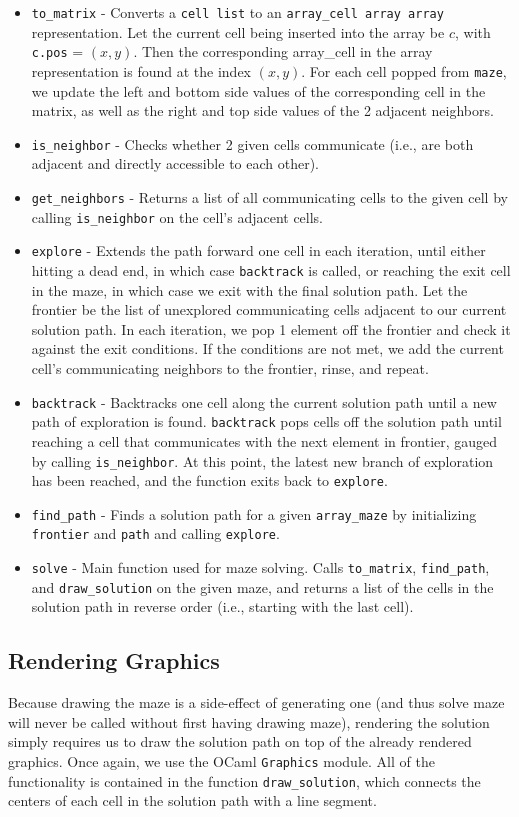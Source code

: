 \documentclass[11pt, margin=1in]{article}
\begin{document}
\begin{itemize}
\item \texttt{to\_matrix} - Converts a \texttt{cell list} to an \texttt{array\_cell array array} representation. Let the current cell being inserted into the array be $c$, with \texttt{c.pos} = $(x, y)$. Then the corresponding array\_cell in the array representation is found at the index $(x, y)$. For each cell popped from \texttt{maze}, we update the left and bottom side values of the corresponding cell in the matrix, as well as the right and top side values of the 2 adjacent neighbors.
\item \texttt{is\_neighbor} - Checks whether 2 given cells communicate (i.e., are both adjacent and directly accessible to each other).
\item \texttt{get\_neighbors} - Returns a list of all communicating cells to the given cell by calling \texttt{is\_neighbor} on the cell's adjacent cells.
\item \texttt{explore} - Extends the path forward one cell in each iteration, until either hitting a dead end, in which case \texttt{backtrack} is called, or reaching the exit cell in the maze, in which case we exit with the final solution path. Let the frontier be the list of unexplored communicating cells adjacent to our current solution path. In each iteration, we pop 1 element off the frontier and check it against the exit conditions. If the conditions are not met, we add the current cell's communicating neighbors to the frontier, rinse, and repeat.
\item \texttt{backtrack} - Backtracks one cell along the current solution path until a new path of exploration is found.   \texttt{backtrack} pops cells off the solution path until reaching a cell that communicates with the next element in frontier, gauged by calling \texttt{is\_neighbor}. At this point, the latest new branch of exploration has been reached, and the function exits back to \texttt{explore}. 
\item \texttt{find\_path} - Finds a solution path for a given \texttt{array\_maze} by initializing \texttt{frontier} and \texttt{path} and calling \texttt{explore}.
\item \texttt{solve} - Main function used for maze solving. Calls \texttt{to\_matrix}, \texttt{find\_path}, and \texttt{draw\_solution} on the given maze, and returns a list of the cells in the solution path in reverse order (i.e., starting with the last cell).
\end{itemize}

\subsection{Rendering Graphics} %
Because drawing the maze is a side-effect of generating one (and thus solve maze will never be called without first having drawing maze), rendering the solution simply requires us to draw the solution path on top of the already rendered graphics. Once again, we use the OCaml \texttt{Graphics} module. All of the functionality is contained in the function \texttt{draw\_solution}, which connects the centers of each cell in the solution path with a line segment.
\end{document}
